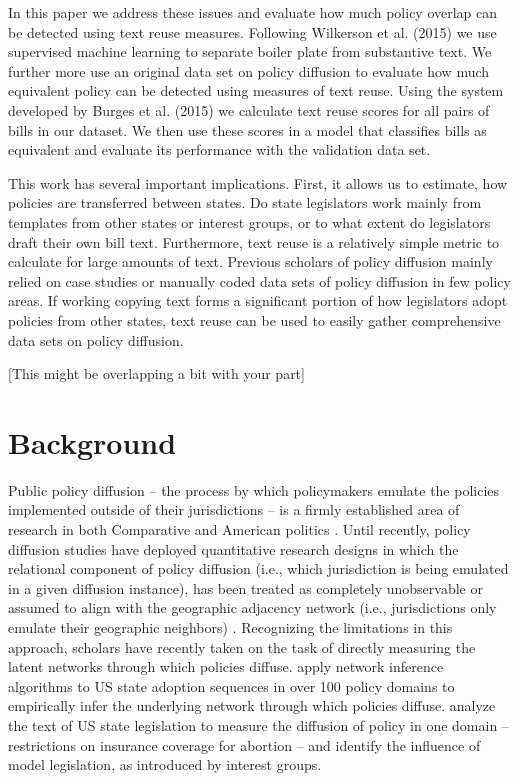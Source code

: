 \documentclass[12pt]{article} %
\begin{document}
In this paper we address these issues and evaluate how much policy overlap can
be detected using text reuse measures. Following Wilkerson et al. (2015) we use
supervised machine learning to separate boiler plate from substantive text. We
further more use an original data set on policy diffusion to evaluate how much
equivalent policy can be detected using measures of text reuse. Using the system
developed by Burges et al. (2015) we calculate text reuse scores for all pairs
of bills in our dataset. We then use these scores in a model that classifies
bills as equivalent and evaluate its performance with the validation data set. 

This work has several important implications. First, it allows us to estimate,
how policies are transferred between states. Do state legislators work mainly
from templates from other states or interest groups, or to what extent do
legislators draft their own bill text. Furthermore, text reuse is a relatively
simple metric to calculate for large amounts of text. Previous scholars of
policy diffusion mainly relied on case studies or manually coded data sets of
policy diffusion in few policy areas. If working copying text forms a
significant portion of how legislators adopt policies from other states, text
reuse can be used to easily gather comprehensive data sets on policy diffusion. 

[This might be overlapping a bit with your part]

\section{Background}

Public policy diffusion -- the process by which policymakers emulate the policies implemented outside of their jurisdictions -- is a firmly established area of research in both Comparative \citep{simmons2004,gilardi2009} and American politics \citep{walker1969,berry1990,shipan2006,nicholson-crotty2009}. Until recently, policy diffusion studies have deployed quantitative research designs in which the relational component of policy diffusion (i.e., which jurisdiction is being emulated in a given diffusion instance), has been treated as completely unobservable or assumed to align with the geographic adjacency network (i.e., jurisdictions only emulate their geographic neighbors) \citep{volden2006,boehmke2009}. Recognizing the limitations in this approach, scholars have recently taken on the task of directly measuring the latent networks through which policies diffuse. \cite{desmarais2015} apply network inference algorithms to US state adoption sequences in over 100 policy domains to empirically infer the underlying network through which policies diffuse. \cite{garrett2015} analyze the text of US state legislation to measure the diffusion of policy in one domain -- restrictions on insurance coverage for abortion -- and identify the influence of model legislation, as introduced by interest groups.
\end{document}

